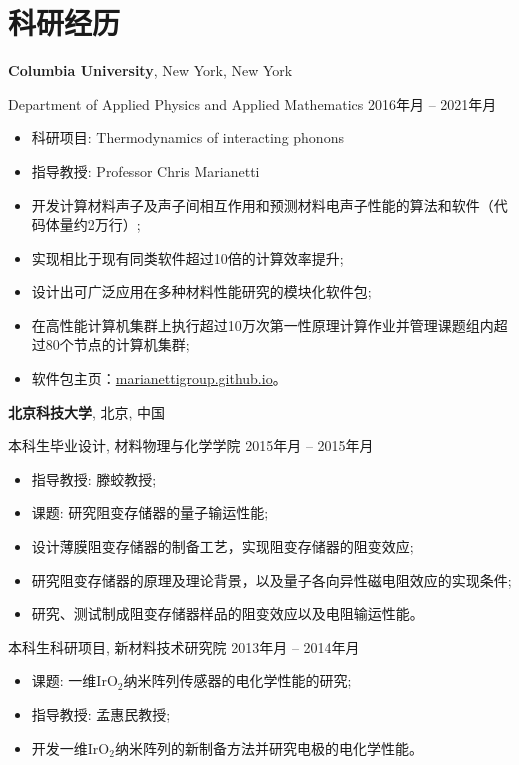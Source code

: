 \documentclass[
  a4paper,
  12pt
]{cv}
\renewcommand{\DatestampYMD}[3]{\mbox{#1年\number#2月}}
\begin{document}
\section{科研经历}

{\textbf{Columbia University}},
New York, New York

Department of Applied Physics and Applied Mathematics
\hfill
\DatestampYMD{2016}{05}{17} --
\DatestampYMD{2021}{10}{20}
\begin{itemize}
\item 科研项目: Thermodynamics of interacting phonons
\item 指导教授: Professor Chris Marianetti
\item 开发计算材料声子及声子间相互作用和预测材料电声子性能的算法和软件（代码体量约2万行）;
\item 实现相比于现有同类软件超过10倍的计算效率提升;
\item 设计出可广泛应用在多种材料性能研究的模块化软件包;
\item 在高性能计算机集群上执行超过10万次第一性原理计算作业并管理课题组内超过80个节点的计算机集群;
\item 软件包主页：\href{https://marianettigroup.github.io}{marianettigroup.github.io}。
\end{itemize}

{\textbf{北京科技大学}},
北京, 中国

本科生毕业设计, 
材料物理与化学学院
\hfill
\DatestampYMD{2015}{02}{01} --
\DatestampYMD{2015}{06}{25}
\begin{itemize}
\item 指导教授: 滕蛟教授;
\item 课题: 研究阻变存储器的量子输运性能; 
\item 设计薄膜阻变存储器的制备工艺，实现阻变存储器的阻变效应; 
\item 研究阻变存储器的原理及理论背景，以及量子各向异性磁电阻效应的实现条件; 
\item 研究、测试制成阻变存储器样品的阻变效应以及电阻输运性能。
\end{itemize}


\vspace{.25em}
本科生科研项目,
新材料技术研究院
\hfill
\DatestampYMD{2013}{10}{05} --
\DatestampYMD{2014}{05}{31}
\begin{itemize}
\item 课题: 一维IrO$_{2}$纳米阵列传感器的电化学性能的研究; 
\item 指导教授: 孟惠民教授; 
\item 开发一维IrO$_{2}$纳米阵列的新制备方法并研究电极的电化学性能。
\end{itemize}
\end{document}

